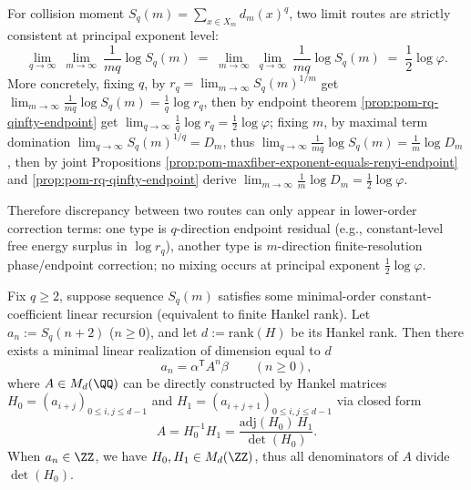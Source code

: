 \begin{corollary}\label{cor:pom-double-limit-commute-principal-exponent}
For collision moment \(S_q(m)=\sum_{x\in X_m}d_m(x)^q\), two limit routes are strictly consistent at principal exponent level:
\[
\lim_{q\to\infty}\ \lim_{m\to\infty}\ \frac{1}{mq}\log S_q(m)
\;=\;
\lim_{m\to\infty}\ \lim_{q\to\infty}\ \frac{1}{mq}\log S_q(m)
\;=\;\frac12\log\varphi.
\]
More concretely, fixing \(q\), by \(r_q=\lim_{m\to\infty}S_q(m)^{1/m}\) get
\(
\lim_{m\to\infty}\frac{1}{mq}\log S_q(m)=\frac{1}{q}\log r_q
\), then by endpoint theorem \ref{prop:pom-rq-qinfty-endpoint} get \(\lim_{q\to\infty}\frac{1}{q}\log r_q=\frac12\log\varphi\);
fixing \(m\), by maximal term domination \(\lim_{q\to\infty}S_q(m)^{1/q}=D_m\), thus
\(
\lim_{q\to\infty}\frac{1}{mq}\log S_q(m)=\frac{1}{m}\log D_m
\), then by joint Propositions \ref{prop:pom-maxfiber-exponent-equals-renyi-endpoint} and \ref{prop:pom-rq-qinfty-endpoint} derive \(\lim_{m\to\infty}\frac{1}{m}\log D_m=\frac12\log\varphi\).
\par
Therefore discrepancy between two routes can only appear in lower-order correction terms: one type is \(q\)-direction endpoint residual (e.g., constant-level free energy surplus in \(\log r_q\)), another type is \(m\)-direction finite-resolution phase/endpoint correction; no mixing occurs at principal exponent \(\tfrac12\log\varphi\).
\end{corollary}

\begin{proposition}\label{prop:pom-hankel-realization-protocol}
Fix \(q\ge 2\), suppose sequence \(S_q(m)\) satisfies some minimal-order constant-coefficient linear recursion (equivalent to finite Hankel rank).
Let \(a_n:=S_q(n+2)\) (\(n\ge 0\)), and let \(d:=\mathrm{rank}(H)\) be its Hankel rank.
Then there exists a minimal linear realization of dimension equal to \(d\)
\[
a_n=\alpha^{\mathsf T}A^n\beta\qquad(n\ge 0),
\]
where \(A\in M_d(\QQ)\) can be directly constructed by Hankel matrices \(H_0=(a_{i+j})_{0\le i,j\le d-1}\) and \(H_1=(a_{i+j+1})_{0\le i,j\le d-1}\) via closed form
\[
A=H_0^{-1}H_1=\frac{\mathrm{adj}(H_0)\,H_1}{\det(H_0)}.
\]
When \(a_n\in\ZZ\), we have \(H_0,H_1\in M_d(\ZZ)\), thus all denominators of \(A\) divide \(\det(H_0)\).
\end{proposition}

